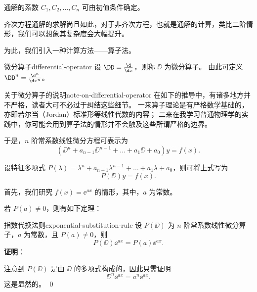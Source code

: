 通解的系数 $ C_1 , C_2 , \ldots , C_n $ 可由初值条件确定。

\bigskip

齐次方程通解的求解尚且如此，对于非齐次方程，也就是通解的计算，类比二阶情形，我们可以想象其复杂度会大幅提升。

为此，我们引入一种计算方法——算子法。

\begin{definition}{微分算子}{differential-operator}
    设 $ \DD = \frac{\d}{\d x} $，则称 $ \DD $ 为微分算子。
    由此可定义 $ \DD^n = \frac{\d^n}{\d x^n} $。
\end{definition}

\begin{note}{关于微分算子的说明}{note-on-differential-operator}
    在如下的推导中，有诸多地方并不严格，读者大可不必过于纠结这些细节。
    一来算子理论是有严格数学基础的，亦即若尔当（Jordan）标准形等线性代数的内容；
    二来在我学习普通物理学的实践中，你可能会用到算子法的情形并不会触及这些所谓严格的边界。
\end{note}

于是，$ n $ 阶常系数线性微分方程可表示为
\begin{equation}
    (\DD^n + a_{n-1} \DD^{n-1} + \ldots + a_1 \DD + a_0) y = f(x) .
\end{equation}

设特征多项式 $ P(\lambda) = \lambda^n + a_{n-1} \lambda^{n-1} + \ldots + a_1 \lambda + a_0 $，则可将上式写为
\begin{equation}
    P(\DD) y = f(x) .
\end{equation}

首先，我们研究 $ f(x) = \ee^{ax} $ 的情形，其中，$ a $ 为常数。

若 $ P(a) \neq 0 $，则有如下定理：
\begin{theorem}{指数代换法则}{exponential-substitution-rule}
    设 $ P(\DD) $ 为 $ n $ 阶常系数线性微分算子，$ a $ 为常数，且 $ P(a) \neq 0 $，则
    \begin{equation}
        P(\DD) \ee^{ax} = P(a) \ee^{ax} .
    \end{equation}
    \textbf{证明}：

    注意到 $ P(\DD) $ 是由 $ \DD $ 的多项式构成的，因此只需证明
    \begin{equation*}
        \DD^n \ee^{ax} = a^n \ee^{ax} .
    \end{equation*}
    这是显然的。
    \qed
\end{theorem}

